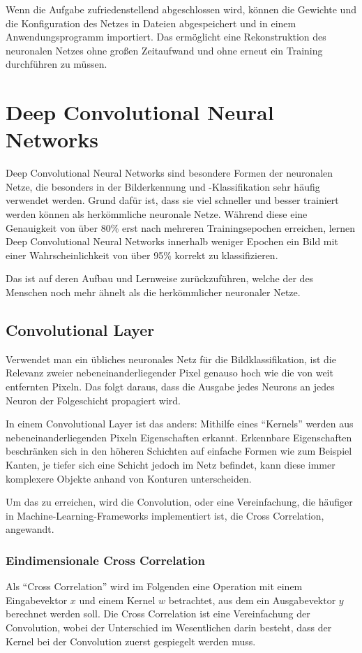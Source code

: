 \documentclass[12pt,a4]{article}
\begin{document}
Wenn die Aufgabe zufriedenstellend abgeschlossen wird, können die Gewichte und die Konfiguration des Netzes in Dateien abgespeichert und in einem Anwendungsprogramm importiert. Das ermöglicht eine Rekonstruktion des neuronalen Netzes ohne großen Zeitaufwand und ohne erneut ein Training durchführen zu müssen.

\section{Deep Convolutional Neural Networks \cite{PythonMachineLearningChapter15}}
Deep Convolutional Neural Networks sind besondere Formen der neuronalen Netze, die besonders in der Bilderkennung und -Klassifikation sehr häufig verwendet werden. Grund dafür ist, dass sie viel schneller und besser trainiert werden können als herkömmliche neuronale Netze. Während diese eine Genauigkeit von über 80\% erst nach mehreren Trainingsepochen erreichen, lernen Deep Convolutional Neural Networks innerhalb weniger Epochen ein Bild mit einer Wahrscheinlichkeit von über 95\% korrekt zu klassifizieren.

Das ist auf deren Aufbau und Lernweise zurückzuführen, welche der des Menschen noch mehr ähnelt als die herkömmlicher neuronaler Netze.

\subsection{Convolutional Layer}
Verwendet man ein übliches neuronales Netz für die Bildklassifikation, ist die Relevanz zweier nebeneinanderliegender Pixel genauso hoch wie die von weit entfernten Pixeln. Das folgt daraus, dass die Ausgabe jedes Neurons an jedes Neuron der Folgeschicht propagiert wird.

In einem Convolutional Layer ist das anders: Mithilfe eines \enquote{Kernels} werden aus nebeneinanderliegenden Pixeln Eigenschaften erkannt. Erkennbare Eigenschaften beschränken sich in den höheren Schichten auf einfache Formen wie zum Beispiel Kanten, je tiefer sich eine Schicht jedoch im Netz befindet, kann diese immer komplexere Objekte anhand von Konturen unterscheiden.

Um das zu erreichen, wird die Convolution, oder eine Vereinfachung, die häufiger in Machine-Learning-Frameworks implementiert ist, die Cross Correlation, angewandt.

\subsubsection{Eindimensionale Cross Correlation}
Als \enquote{Cross Correlation} wird im Folgenden eine Operation mit einem Eingabevektor $x$ und einem Kernel $w$ betrachtet, aus dem ein Ausgabevektor $y$ berechnet werden soll. Die Cross Correlation ist eine Vereinfachung der Convolution, wobei der Unterschied im Wesentlichen darin besteht, dass der Kernel bei der Convolution zuerst gespiegelt werden muss.
\end{document}

